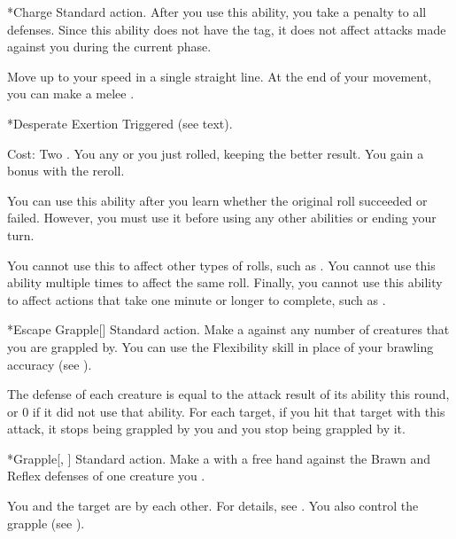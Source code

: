   \begin{activeability}*{Charge}
    \abilityusagetime Standard action.
    \rankline
    After you use this ability, you  take a  penalty to all defenses.
    Since this ability does not have the  tag, it does not affect attacks made against you during the current phase.

    Move up to your speed in a single straight line.
    At the end of your movement, you can make a melee .
  \end{activeability}

  \begin{activeability}*{Desperate Exertion}
    \abilityusagetime Triggered (see text).
    \par \noindent Cost: Two .
    \rankline
    You  any  or  you just rolled, keeping the better result.
    You gain a  bonus with the reroll.

    You can use this ability after you learn whether the original roll succeeded or failed.
    However, you must use it before using any other abilities or ending your turn.

    You cannot use this to affect other types of rolls, such as .
    You cannot use this ability multiple times to affect the same roll.
    Finally, you cannot use this ability to affect actions that take one minute or longer to complete, such as .
  \end{activeability}

  \begin{activeability}*{Escape Grapple}[]
    \abilityusagetime Standard action.
    \rankline
    Make a  against any number of creatures that you are grappled by.
    You can use the Flexibility skill in place of your brawling accuracy (see ).

    The defense of each creature is equal to the attack result of its  ability this round, or 0 if it did not use that ability.
    For each target, if you hit that target with this attack, it stops being grappled by you and you stop being grappled by it.
  \end{activeability}

  \begin{activeability}*{Grapple}[, ]
    \abilityusagetime Standard action.
    \rankline
    Make a  with a free hand against the Brawn and Reflex defenses of one creature you .

    \hit You and the target are \grappled by each other.
    For details, see .
    \crit You also control the grapple (see ).
  \end{activeability}

